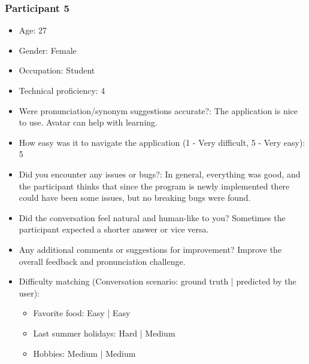 \documentclass{article}
\begin{document}
\subsubsection{Participant 5}
\begin{itemize} 
    \item Age: 27
    \item Gender: Female
    \item Occupation: Student
    \item Technical proficiency: 4
    \item Were pronunciation/synonym suggestions accurate?: The application is nice to use. Avatar can help with learning.
    \item How easy was it to navigate the application (1 - Very difficult, 5 - Very easy): 5
    \item Did you encounter any issues or bugs?: In general, everything was good, and the participant thinks that since the program is newly implemented there could have been some issues, but no breaking bugs were found.
    \item Did the conversation feel natural and human-like to you? Sometimes the participant expected a shorter answer or vice versa.
    \item Any additional comments or suggestions for improvement? Improve the overall feedback and pronunciation challenge.
    \item Difficulty matching (Conversation scenario: ground truth | predicted by the user):
    \begin{itemize}
        \item Favorite food: Easy | Easy
        \item Last summer holidays: Hard | Medium
        \item Hobbies: Medium | Medium
    \end{itemize}
\end{itemize}
\end{document}

